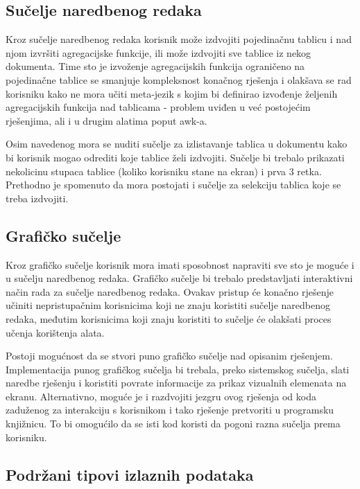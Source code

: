 \documentclass[times, utf8, zavrsni]{fer}
\begin{document}
\subsection{Sučelje naredbenog redaka}

Kroz sučelje naredbenog redaka korisnik može izdvojiti pojedinačnu tablicu i nad
njom izvršiti agregacijske funkcije, ili može izdvojiti sve tablice iz nekog
dokumenta. Time sto je izvoženje agregacijskih funkcija ograničeno na
pojedinačne tablice se smanjuje kompleksnost konačnog rješenja i olakšava se
rad korisniku kako ne mora učiti meta-jezik s kojim bi definirao izvođenje
željenih agregacijskih funkcija nad tablicama - problem uviđen u već postojećim
rješenjima, ali i u drugim alatima poput awk-a.

Osim navedenog mora se nuditi sučelje za izlistavanje tablica u dokumentu
kako bi korisnik mogao odrediti koje tablice želi izdvojiti. Sučelje bi
trebalo prikazati nekolicinu stupaca tablice (koliko korisniku stane na ekran)
i prva 3 retka.  Prethodno je spomenuto da mora postojati i sučelje za
selekciju tablica koje se treba izdvojiti.

\subsection{Grafičko sučelje}

Kroz grafičko sučelje korisnik mora imati sposobnost napraviti sve sto je
moguće i u sučelju naredbenog redaka. Grafičko sučelje bi trebalo predstavljati
interaktivni način rada za sučelje naredbenog redaka. Ovakav pristup će konačno
rješenje učiniti nepristupačnim korisnicima koji ne znaju koristiti sučelje
naredbenog redaka, međutim korisnicima koji znaju koristiti to sučelje će
olakšati proces učenja korištenja alata.

Postoji mogućnost da se stvori puno grafičko sučelje nad opisanim rješenjem.
Implementacija punog grafičkog sučelja bi trebala, preko sistemskog sučelja,
slati naredbe rješenju i koristiti povrate informacije za prikaz vizualnih
elemenata na ekranu. Alternativno, moguće je i razdvojiti jezgru ovog rješenja
od koda zaduženog za interakciju s korisnikom i tako rješenje pretvoriti u
programsku knjižnicu. To bi omogućilo da se isti kod koristi da pogoni razna
sučelja prema korisniku.

\subsection{Podržani tipovi izlaznih podataka}
\end{document}
